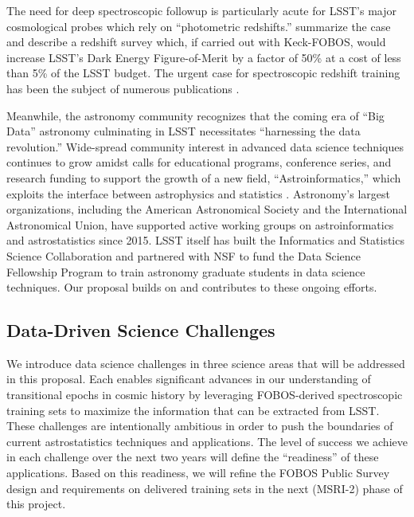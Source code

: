\documentclass[oneside,11pt]{amsart}
\begin{document}
The need for deep spectroscopic followup is particularly acute for LSST's major cosmological probes which rely on ``photometric redshifts.''  \citet{newman15} summarize the case and describe a redshift survey which, if carried out with Keck-FOBOS, would increase LSST's Dark Energy Figure-of-Merit by a factor of 50\% at a cost of less than 5\% of the LSST budget.  The urgent case for spectroscopic redshift training has been the subject of numerous publications \citep[e.g.,][]{laureijs11,masters15, hemmati18}.  

Meanwhile, the astronomy community recognizes that the coming era of ``Big Data'' astronomy culminating in LSST
necessitates ``harnessing the data revolution.''  Wide-spread community interest in advanced data science techniques
continues to grow amidst calls for educational programs, conference series, and research funding to support the
growth of a new field, ``Astroinformatics,'' which exploits the interface between astrophysics and statistics
\citep{borne09}.  Astronomy's largest organizations, including the American Astronomical Society and the International
Astronomical Union, have supported active working groups on astroinformatics and astrostatistics since 2015.  LSST
itself has built the Informatics and Statistics Science Collaboration and partnered with NSF to fund the Data Science
Fellowship Program to train astronomy graduate students in data science techniques.  Our proposal builds on and
contributes to these ongoing efforts.




\subsection{Data-Driven Science Challenges}
\label{sec:goals}

We introduce data science challenges in three science areas that will be addressed in this proposal.  Each enables significant advances in our understanding of transitional epochs in cosmic history by leveraging FOBOS-derived spectroscopic training sets to maximize the information that can be extracted from LSST.  These challenges are intentionally ambitious in order to push the boundaries of current astrostatistics techniques and applications.  The level of success we achieve in each challenge over the next two years will define the ``readiness'' of these applications.  Based on this readiness, we will refine the FOBOS Public Survey design and requirements on delivered training sets in the next (MSRI-2) phase of this project.
\end{document}
